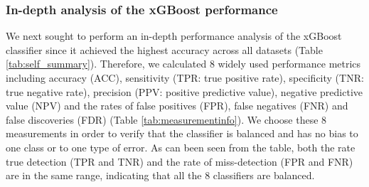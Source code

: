\documentclass{bmcart}
\begin{document}
\subsubsection*{In-depth analysis of the xGBoost performance}
We next sought to perform an in-depth performance analysis of the xGBoost classifier since it achieved the highest accuracy across all datasets (Table \ref{tab:self_summary}). Therefore, we calculated 8 widely used performance metrics including accuracy (ACC), sensitivity (TPR: true positive rate), speciﬁcity (TNR: true negative rate), precision (PPV: positive predictive value), negative predictive value (NPV) and the rates of false positives (FPR), false negatives (FNR) and false discoveries (FDR) (Table \ref{tab:measurementinfo}). We choose these 8 measurements in order to verify that the classifier is balanced and has no bias to one class or to one type of error. As can been seen from the table, both the rate true detection (TPR and TNR) and the rate of miss-detection (FPR and FNR) are in the same range, indicating that all the 8 classifiers are balanced.


\end{document}
